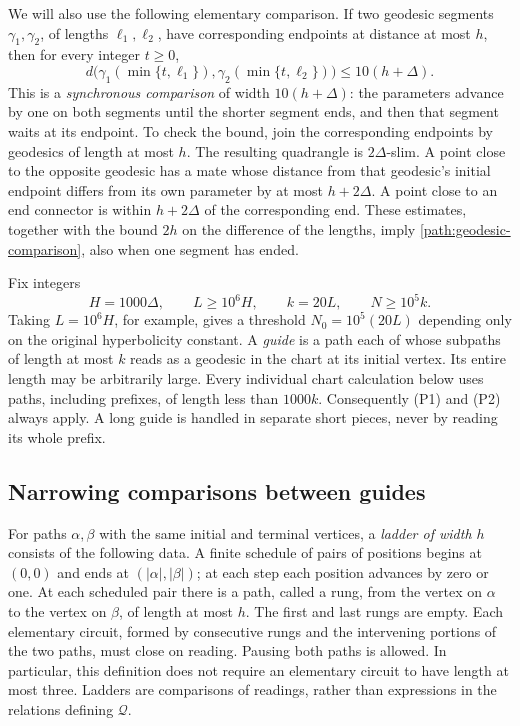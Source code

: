 \documentclass[11pt,reqno]{amsart}
\numberwithin{equation}{section}
\theoremstyle{definition}
\theoremstyle{remark}
\begin{document}
We will also use the following elementary comparison.  If two geodesic
segments $\gamma_1,\gamma_2$, of lengths $\ell_1,\ell_2$, have
corresponding endpoints at distance at most $h$, then for every integer
$t\ge0$,
\begin{equation}\label{path:geodesic-comparison}
 d\bigl(\gamma_1(\min\{t,\ell_1\}),
        \gamma_2(\min\{t,\ell_2\})\bigr)\le10(h+\Delta).
\end{equation}
This is a \emph{synchronous comparison} of width $10(h+\Delta)$:
the parameters advance by one on both segments until the shorter
segment ends, and then that segment waits at its endpoint.
To check the bound, join the
corresponding endpoints by geodesics of length at most $h$.  The resulting
quadrangle is $2\Delta$-slim.  A point close to the opposite geodesic has
a mate whose distance from that geodesic's initial endpoint differs from
its own parameter by at most $h+2\Delta$.  A point close to an end
connector is within $h+2\Delta$ of the corresponding end.  These estimates,
together with the bound $2h$ on the difference of the lengths, imply
\eqref{path:geodesic-comparison}, also when one segment has ended.

Fix integers
\begin{equation}\label{path:constants}
 H=1000\Delta,\qquad L\ge10^6H,\qquad k=20L,
 \qquad N\ge10^5k.
\end{equation}
Taking $L=10^6H$, for example, gives a threshold $N_0=10^5(20L)$
depending only on the original hyperbolicity constant.
A \emph{guide} is a path each of whose subpaths of length at most $k$
reads as a geodesic in the chart at its initial vertex.  Its entire
length may be arbitrarily large.  Every individual chart calculation
below uses paths, including prefixes, of length less than $1000k$.
Consequently (P1) and (P2) always apply.  A long guide is handled in
separate short pieces, never by reading its whole prefix.

\subsection{Narrowing comparisons between guides}

For paths $\alpha,\beta$ with the same initial and terminal vertices, a
\emph{ladder of width $h$} consists of the following data.  A finite
schedule of pairs of positions begins at $(0,0)$ and ends at
$(|\alpha|,|\beta|)$; at each step each position advances by zero or one.
At each scheduled pair there is a path, called a rung, from the vertex
on $\alpha$ to the vertex on $\beta$, of length at most $h$.  The first
and last rungs are empty.  Each elementary circuit, formed by consecutive
rungs and the intervening portions of the two paths, must close on
reading.  Pausing both paths is allowed.  In particular, this definition
does not require an elementary circuit to have length at most three.
Ladders are comparisons of readings, rather than expressions in the
relations defining $\mathcal Q$.
\end{document}
